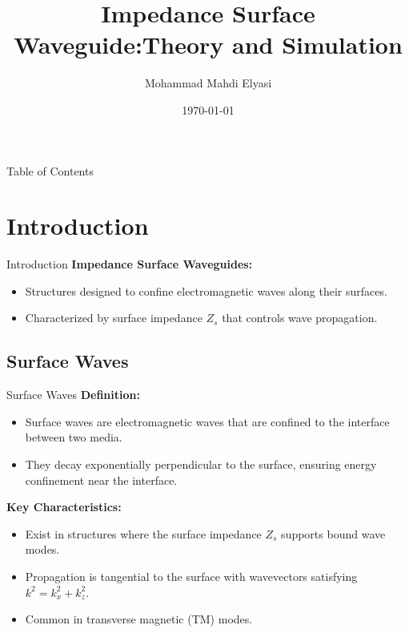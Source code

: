 \documentclass{beamer}
\title[Impedance Surface Waveguide]{Impedance Surface Waveguide:Theory and Simulation}
\author[]{Mohammad Mahdi Elyasi}
\institute[Amirkabir University of Techonology]{
    Supervisor: Dr. Askarpour \\[1cm] %
    Faculty of Electrical Engineering \\ %
}
\date{\today} %
\begin{document}
\begin{frame}
    
    \titlepage
\end{frame}

\begin{frame}{Table of Contents}
    \tableofcontents
\end{frame}

\section{Introduction}
\begin{frame}{Introduction}
    \textbf{Impedance Surface Waveguides:}
    \begin{itemize}
        \item Structures designed to confine electromagnetic waves along their surfaces.
        \item Characterized by surface impedance \( Z_s \) that controls wave propagation.
    \end{itemize}
\end{frame}

\subsection{Surface Waves}
\begin{frame}{Surface Waves}
    \textbf{Definition:}
    \begin{itemize}
        \item Surface waves are electromagnetic waves that are confined to the interface between two media\cite{R.Quarfoth}.
        \item They decay exponentially perpendicular to the surface, ensuring energy confinement near the interface.
    \end{itemize}
    \textbf{Key Characteristics:}
    \begin{itemize}
        \item Exist in structures where the surface impedance \( Z_s \) supports bound wave modes.
        \item Propagation is tangential to the surface with wavevectors satisfying \( k^2 = k_x^2 + k_z^2 \).
        \item Common in transverse magnetic (TM) modes.
    \end{itemize}
\end{frame}
\end{document}
